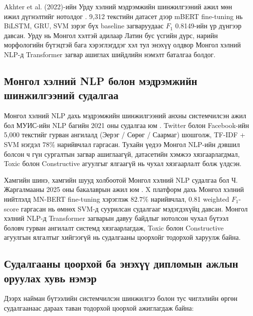 Akhter et al. (2022)-ийн Урду хэлний мэдрэмжийн шинжилгээний ажил мөн ижил
дүгнэлтийг нотолдог \cite{akhter2022}. 9,312 текстийн датасет дээр mBERT
fine-tuning нь BiLSTM, GRU, SVM зэрэг бүх baseline загваруудаас $F_1$ 0.8149-ийн
үр дүнгээр давсан. Урду нь Монгол хэлтэй адилаар Латин бус үсгийн дүрс, нарийн
морфологийн бүтэцтэй бага хэрэглэгддэг хэл тул энэхүү олдвор Монгол хэлний
NLP-д Transformer загвар ашиглах шийдлийн нэмэлт баталгаа болдог.

\subsection{Монгол хэлний NLP болон мэдрэмжийн шинжилгээний судалгаа}

Монгол хэлний NLP дахь мэдрэмжийн шинжилгээний анхны системчилсэн ажил бол
МУИС-ийн NLP багийн 2021 оны судалгаа юм \cite{mnunlp2021}. Twitter болон
Facebook-ийн 5,000 текстийг гурван ангилалд (Эерэг / Сөрөг / Саармаг)
шошголж, TF-IDF + SVM нэгдэл $78\%$ нарийвчлал гаргасан. Тухайн үедээ Монгол
NLP-ийн дэвшил болсон ч гүн сургалтын загвар ашиглаагүй, датасетийн хэмжээ
хязгаарлагдмал, Toxic болон Constructive агуулгыг ялгаагүй нь чухал хязгаарлалт
болж үлдсэн.

Хамгийн шинэ, хамгийн шууд холбоотой Монгол хэлний NLP судалгаа бол Ч.
Жаргалмааны 2025 оны бакалаврын ажил юм \cite{jargalmaa2025}. X платформ дахь
Монгол хэлний нийтлэлд MN-BERT fine-tuning хэрэглэж $82.7\%$ нарийвчлал, 0.81
weighted $F_1$-score гаргасан нь өмнөх SVM-д суурилсан судалгааг мэдэгдэхүйц
давсан. Монгол хэлний NLP-д Transformer загварын давуу байдлыг нотолсон чухал
бүтээл боловч гурван ангилалт системд хязгаарлагдаж, Toxic болон Constructive
агуулгын ялгалтыг хийгээгүй нь судалгааны цоорхойг тодорхой харуулж байна.

\subsection{Судалгааны цоорхой ба энэхүү дипломын ажлын оруулах хувь нэмэр}

Дээрх найман бүтээлийн системчилсэн шинжилгээ болон тус чиглэлийн өргөн
судалгаанаас дараах таван тодорхой цоорхой ажиглагдаж байна:

